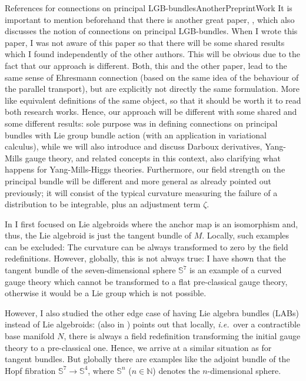 \documentclass[reqno,a4paper,oneside]{amsart}
\theoremstyle{plain}
\theoremstyle{remark}
\theoremstyle{definition}
\begin{document}
	\begin{remarks}{References for connections on principal LGB-bundles}{AnotherPreprintWork}
It is important to mention beforehand that there is another great paper, \cite{OtherPreprintAboutConnection}, which also discusses the notion of connections on principal LGB-bundles. When I wrote this paper, I was not aware of this paper so that there will be some shared results which I found independently of the other authors. This will be obvious due to the fact that our approach is different. Both, this and the other paper, lead to the same sense of Ehresmann connection (based on the same idea of the behaviour of the parallel transport), but are explicitly not directly the same formulation. More like equivalent definitions of the same object, so that it should be worth it to read both research works. Hence, our approach will be different with some shared and some different results: \cite{OtherPreprintAboutConnection} sole purpose was in defining connections on principal bundles with Lie group bundle action (with an application in variational calculus), while we will also introduce and discuss Darboux derivatives, Yang-Mills gauge theory, and related concepts in this context, also clarifying what happens for Yang-Mills-Higgs theories. Furthermore, our field strength on the principal bundle will be different and more general as already pointed out previously; it will consist of the typical curvature measuring the failure of a distribution to be integrable, plus an adjustment term $\zeta$.
\end{remarks}

In \cite{MyThesis} I first focused on Lie algebroids where the anchor map is an isomorphism and, thus, the Lie algebroid is just the tangent bundle of $M$. Locally, such examples can be excluded: The curvature can be always transformed to zero by the field redefinitions. However, globally, this is not always true: I have shown that the tangent bundle of the seven-dimensional sphere $\mathbb{S}^7$ is an example of a curved gauge theory which cannot be transformed to a flat pre-classical gauge theory, otherwise it would be a Lie group which is not possible.

However, I also studied the other edge case of having Lie algebra bundles (LABs) instead of Lie algebroids: \cite{MyThesis} (also in \cite{My1stpaper}) points out that locally, \textit{i.e.}~over a contractible base manifold $N$, there is always a field redefinition transforming the initial gauge theory to a pre-classical one. Hence, we arrive at a similar situation as for tangent bundles. But globally there are examples like the adjoint bundle of the Hopf fibration $\mathbb{S}^7 \to \mathbb{S}^4$, where $\mathbb{S}^n$ ($n \in \mathbb{N}$) denotes the $n$-dimensional sphere.
\end{document}
